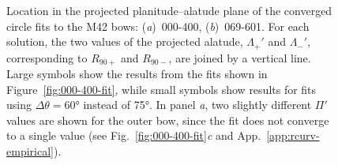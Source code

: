 \begin{figure}
\begin{tabular}{p{0.47\linewidth} p{0.47\linewidth}}
  \end{tabular}
  \caption[]{Location in the projected planitude--alatude plane of the
    converged circle fits to the M42 bows: (\textit{a})~000-400,
    (\textit{b})~069-601. For each solution, the two values of the
    projected alatude, \(\Lambda_+'\) and \(\Lambda_-'\), corresponding to
    \(R_{90+}\) and \(R_{90-}\), are joined by a vertical line. Large
    symbols show the results from the fits shown in
    Figure~\ref{fig:000-400-fit}, while small symbols show results for
    fits using \(\Delta\theta = \ang{60}\) instead of \ang{75}. In panel
    \textit{a}, two slightly different \(\Pi'\) values are shown for the
    outer bow, since the fit does not converge to a single value (see
    Fig.~\ref{fig:000-400-fit}\textit{c} and
    App.~\ref{app:rcurv-empirical}).}
  \label{fig:000-400-planitude-alatude}
\end{figure}

